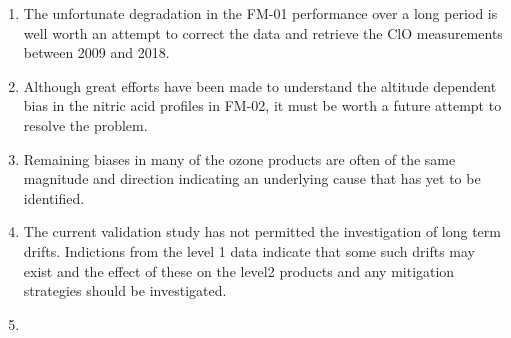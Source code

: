 \begin{enumerate}
\item The unfortunate degradation in the FM-01 performance over a long period is well worth an attempt to correct the data and retrieve the  ClO measurements between 2009 and 2018.  
\item Although great efforts have been made to understand the altitude dependent bias in the nitric acid profiles in FM-02, it must be worth a future attempt to resolve the problem.
\item Remaining biases in many of the ozone products are often of the same magnitude and direction indicating an underlying  cause that has yet to be identified.
\item The current validation study has not permitted the investigation of long term drifts.  Indictions from the level 1 data indicate that some such drifts may exist and the effect of these on the level2 products and any mitigation strategies should be investigated.
\item  
\end{enumerate}
 
